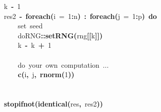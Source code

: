 \documentclass[a4paper,12pt]{article}\usepackage{graphicx, color}
\makeatletter
\newcommand{\hlnumber}[1]{\textcolor[rgb]{0,0,0}{#1}}%
\newcommand{\hlfunctioncall}[1]{\textcolor[rgb]{0.501960784313725,0,0.329411764705882}{\textbf{#1}}}%
\newcommand{\hlkeyword}[1]{\textcolor[rgb]{0,0,0}{\textbf{#1}}}%
\newcommand{\hlargument}[1]{\textcolor[rgb]{0.690196078431373,0.250980392156863,0.0196078431372549}{#1}}%
\newcommand{\hlcomment}[1]{\textcolor[rgb]{0.180392156862745,0.6,0.341176470588235}{#1}}%
\newcommand{\hlassignement}[1]{\textcolor[rgb]{0,0,0}{\textbf{#1}}}%
\newcommand{\hlpackage}[1]{\textcolor[rgb]{0.588235294117647,0.709803921568627,0.145098039215686}{#1}}%
\newcommand{\hlsymbol}[1]{\textcolor[rgb]{0,0,0}{#1}}%
\newcommand{\hlstd}[1]{\textcolor[rgb]{0,0,0}{#1}}%
\newenvironment{kframe}{%
 \def\FrameCommand##1{\hskip\@totalleftmargin \hskip-\fboxsep
 \colorbox{shadecolor}{##1}\hskip-\fboxsep
     \hskip-\linewidth \hskip-\@totalleftmargin \hskip\columnwidth}%
 \MakeFramed {\advance\hsize-\width
   \@totalleftmargin\z@ \linewidth\hsize
   \@setminipage}}%
 {\par\unskip\endMakeFramed}
\newenvironment{knitrout}{}{} %
\renewenvironment{knitrout}{\begin{footnotesize}}{\end{footnotesize}}
\makeatother
\begin{document}
\begin{knitrout}
\begin{kframe}
\begin{flushleft}
\hlstd{}\hlsymbol{k}{\ }\hlassignement{\usebox{\hlnormalsizeboxlessthan}-}{\ }\hlnumber{1}\hspace*{\fill}\\
\hlstd{}\hlsymbol{res2}{\ }\hlassignement{\usebox{\hlnormalsizeboxlessthan}-}{\ }\hlfunctioncall{foreach}\hlkeyword{(}\hlargument{i}{\ }\hlargument{=}{\ }\hlnumber{1}\hlkeyword{:}\hlsymbol{n}\hlkeyword{)}{\ }\hlkeyword{\usebox{\hlnormalsizeboxpercent}:\usebox{\hlnormalsizeboxpercent}}{\ }\hlfunctioncall{foreach}\hlkeyword{(}\hlargument{j}{\ }\hlargument{=}{\ }\hlnumber{1}\hlkeyword{:}\hlsymbol{p}\hlkeyword{)}{\ }\hlkeyword{\usebox{\hlnormalsizeboxpercent}do\usebox{\hlnormalsizeboxpercent}}{\ }\hlkeyword{\usebox{\hlnormalsizeboxopenbrace}}\hspace*{\fill}\\
\hlstd{}{\ }{\ }{\ }{\ }\hlcomment{\usebox{\hlnormalsizeboxhash}{\ }set{\ }seed}\hspace*{\fill}\\
\hlstd{}{\ }{\ }{\ }{\ }\hlpackage{doRNG}\hlkeyword{::}\hlfunctioncall{setRNG}\hlkeyword{(}\hlsymbol{rng}\hlkeyword{[[}\hlsymbol{k}\hlkeyword{]}\hlkeyword{]}\hlkeyword{)}\hspace*{\fill}\\
\hlstd{}{\ }{\ }{\ }{\ }\hlsymbol{k}{\ }\hlassignement{\usebox{\hlnormalsizeboxlessthan}-}{\ }\hlsymbol{k}{\ }\hlkeyword{+}{\ }\hlnumber{1}\hspace*{\fill}\\
\hlstd{}\hspace*{\fill}\\
\hlstd{}{\ }{\ }{\ }{\ }\hlcomment{\usebox{\hlnormalsizeboxhash}{\ }do{\ }your{\ }own{\ }computation{\ }...}\hspace*{\fill}\\
\hlstd{}{\ }{\ }{\ }{\ }\hlfunctioncall{c}\hlkeyword{(}\hlsymbol{i}\hlkeyword{,}{\ }\hlsymbol{j}\hlkeyword{,}{\ }\hlfunctioncall{rnorm}\hlkeyword{(}\hlnumber{1}\hlkeyword{)}\hlkeyword{)}\hspace*{\fill}\\
\hlstd{}\hlkeyword{\usebox{\hlnormalsizeboxclosebrace}}\hspace*{\fill}\\
\hlstd{}\hspace*{\fill}\\
\hlstd{}\hlfunctioncall{stopifnot}\hlkeyword{(}\hlfunctioncall{identical}\hlkeyword{(}\hlsymbol{res}\hlkeyword{,}{\ }\hlsymbol{res2}\hlkeyword{)}\hlkeyword{)}\mbox{}
\normalfont
\end{flushleft}
\end{kframe}
\end{knitrout}
\end{document}
